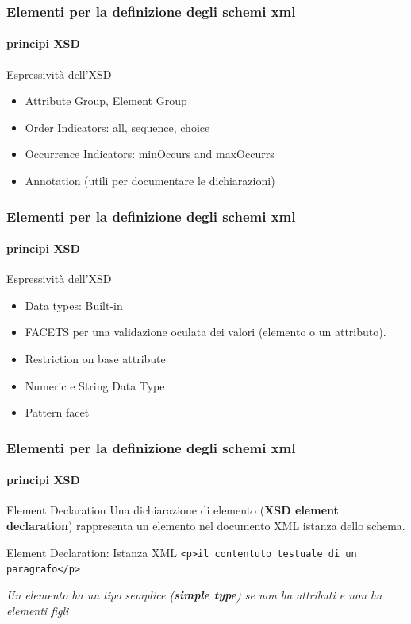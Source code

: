 \begin{frame}
	\frametitle{Elementi per la definizione degli schemi xml}
	\framesubtitle{principi XSD}
	\addtocounter{nframe}{1}

	\begin{block}{Espressività dell'XSD}

		\begin{itemize}
			\item Attribute Group, Element Group
			\item Order Indicators: all, sequence, choice
			\item Occurrence Indicators: minOccurs and maxOccurrs
			\item Annotation (utili per documentare le dichiarazioni)
		\end{itemize}

	\end{block}

\end{frame}

\begin{frame}
	\frametitle{Elementi per la definizione degli schemi xml}
	\framesubtitle{principi XSD}
	\addtocounter{nframe}{1}

	\begin{block}{Espressività dell'XSD}
		\begin{itemize}
			\item Data types: Built-in
			\item FACETS per una validazione oculata dei valori (elemento o un attributo).
			\item Restriction on base attribute
			\item Numeric e String Data Type
			\item Pattern facet
		\end{itemize}

	\end{block}

\end{frame}


\begin{frame}
	\frametitle{Elementi per la definizione degli schemi xml}
	\framesubtitle{principi XSD}
	\addtocounter{nframe}{1}

	\begin{block}{Element Declaration}
		Una dichiarazione di elemento (\textbf{XSD element declaration}) rappresenta un elemento nel documento XML istanza dello schema. 
		
	\end{block}

	\begin{block}{Element Declaration: Istanza XML }
		\texttt{<p>il contentuto testuale di un paragrafo</p>}
	\end{block}
	\textit{Un elemento ha un tipo semplice (\textbf{simple type}) se non ha attributi e non ha elementi figli}
\end{frame}


